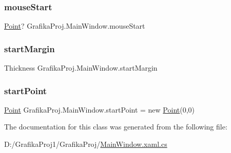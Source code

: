 \subsubsection{\texorpdfstring{mouseStart}{mouseStart}}
{\footnotesize\ttfamily \mbox{\hyperlink{_main_window_8xaml_8cs_af7183cff3a6e75db2170da28384d7419}{Point}}? Grafika\+Proj.\+Main\+Window.\+mouse\+Start\hspace{0.3cm}{\ttfamily [private]}}

\mbox{\label{class_grafika_proj_1_1_main_window_a41a4fdf85f2929739a00381022cfd252}} 
\subsubsection{\texorpdfstring{startMargin}{startMargin}}
{\footnotesize\ttfamily Thickness Grafika\+Proj.\+Main\+Window.\+start\+Margin\hspace{0.3cm}{\ttfamily [private]}}

\mbox{\label{class_grafika_proj_1_1_main_window_a8f69f3a3c8a976ea669d2cbbeff7acfa}} 
\subsubsection{\texorpdfstring{startPoint}{startPoint}}
{\footnotesize\ttfamily \mbox{\hyperlink{_main_window_8xaml_8cs_af7183cff3a6e75db2170da28384d7419}{Point}} Grafika\+Proj.\+Main\+Window.\+start\+Point = new \mbox{\hyperlink{_main_window_8xaml_8cs_af7183cff3a6e75db2170da28384d7419}{Point}}(0,0)\hspace{0.3cm}{\ttfamily [private]}}



The documentation for this class was generated from the following file\+:\begin{DoxyCompactItemize}
\item 
D\+:/\+Grafika\+Proj1/\+Grafika\+Proj/\mbox{\hyperlink{_main_window_8xaml_8cs}{Main\+Window.\+xaml.\+cs}}\end{DoxyCompactItemize}
